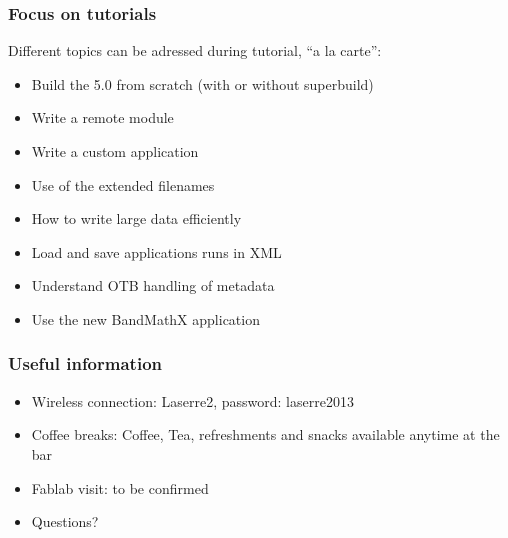 \documentclass[8pt]{beamer}
\begin{document}
\begin{frame}
\frametitle{Focus on tutorials}
Different topics can be adressed during tutorial, ``a la carte'':
\begin{itemize}
\item Build the 5.0 from scratch (with or without superbuild)
\item Write a remote module
\item Write a custom application
\item Use of the extended filenames
\item How to write large data efficiently
\item Load and save applications runs in XML
\item Understand OTB handling of metadata
\item Use the new BandMathX application
\end{itemize}
\end{frame}

\begin{frame}
\frametitle{Useful information}
\begin{itemize}
\item Wireless connection: Laserre2, password: laserre2013
\item Coffee breaks: Coffee, Tea, refreshments and snacks available anytime at the bar
\item Fablab visit: to be confirmed
\item Questions?
\end{itemize}

\end{frame}
\end{document}
